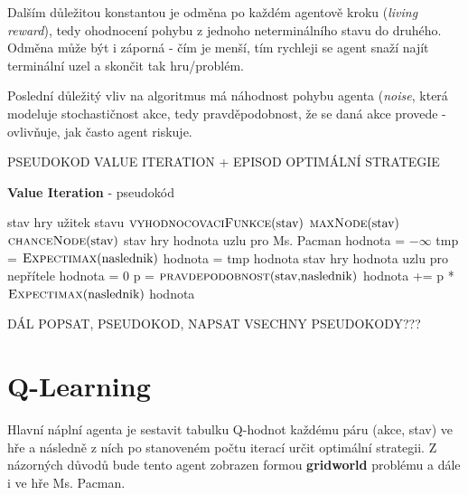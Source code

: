 Dalším důležitou konstantou je odměna po každém agentově kroku (\textit{living reward}), tedy ohodnocení pohybu z jednoho neterminálního stavu do druhého. Odměna může být i záporná - čím je menší, tím rychleji se agent snaží najít terminální uzel a skončit tak hru/problém.

Poslední důležitý vliv na algoritmus má náhodnost pohybu agenta (\textit{noise}, která modeluje stochastičnost akce, tedy pravděpodobnost, že se daná akce provede - ovlivňuje, jak často agent riskuje.


PSEUDOKOD VALUE ITERATION + EPISOD OPTIMÁLNÍ STRATEGIE

\begin{algorithm}
\caption{\textbf{Value Iteration} - pseudokód}
\label{alg:valiter}
\begin{algorithmic}[1]

\Require stav hry
\Ensure užitek stavu
		\State \Return $\text{\Call{vyhodnocovaciFunkce}{stav}}$  
	\EndIf
		\State \Return $\text{\Call{maxNode}{stav}}$  
	\EndIf
		\State \Return $\text{\Call{chanceNode}{stav}}$  
	\EndIf
\EndFunction
\algrule
\Require stav hry
\Ensure hodnota uzlu pro Ms. Pacman
    \State hodnota = $-\infty$
		\State tmp = $\text{\Call{Expectimax}{naslednik}}$
		 
		    \State hodnota = tmp
    	\EndIf
    \EndFor 
    \State \Return hodnota
\EndFunction
\algrule
\Require stav hry
\Ensure hodnota uzlu pro nepřítele
    \State hodnota = 0
		\State p = $\text{\Call{pravdepodobnost}{stav,naslednik}}$ 	
		\State hodnota += p * $\text{\Call{Expectimax}{naslednik}}$
    \EndFor
    \State \Return hodnota 
\EndFunction

\end{algorithmic}
\end{algorithm}

DÁL POPSAT, PSEUDOKOD, NAPSAT VSECHNY PSEUDOKODY???

\section{Q-Learning}
Hlavní náplní agenta je sestavit tabulku Q-hodnot každému páru (akce, stav) ve hře a následně z ních po stanoveném počtu iterací určit optimální strategii. Z názorných důvodů bude tento agent zobrazen formou \textbf{gridworld} problému a dále i ve hře Ms. Pacman.

